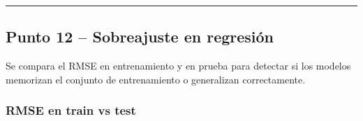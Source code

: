 \documentclass[
]{article}
\begin{document}
\begin{center}\rule{0.5\linewidth}{0.5pt}\end{center}

\hypertarget{punto-12-sobreajuste-en-regresiuxf3n}{%
\subsection{Punto 12 -- Sobreajuste en
regresión}\label{punto-12-sobreajuste-en-regresiuxf3n}}

Se compara el RMSE en entrenamiento y en prueba para detectar si los
modelos memorizan el conjunto de entrenamiento o generalizan
correctamente.

\hypertarget{rmse-en-train-vs-test}{%
\subsubsection{RMSE en train vs test}\label{rmse-en-train-vs-test}}
\end{document}
